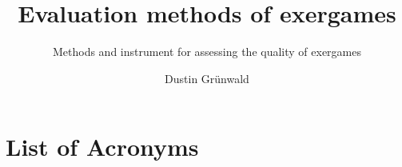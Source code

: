 \documentclass[
	language=english, %
	thesis={type=Seminar Paper}, %
	class=report,%
	ruledheaders=section,%
	accentcolor=3d,%
	marginpar=false,%
	parskip=half-,%
	fontsize=11pt,%
	IMRAD=false %
]{tudapub}
\begin{document}
\title{Evaluation methods of exergames}
\subtitle{Methods and instrument for assessing the quality of exergames}
\author[D. Grünwald]{Dustin Grünwald} %



\maketitle
\affidavit %
\tableofcontents


\clearpage
\chapter*{List of Acronyms}
\printacronyms[heading={none}]

\printbibliography

\appendix

\languagename
\end{document}
